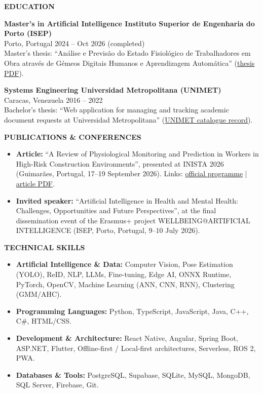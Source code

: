\documentclass[10pt,a4paper]{article}
\newcommand{\cvsection}[1]{%
    \vspace{11pt}%
    {\large\bfseries\color{navy}#1}\par
    \vspace{2pt}{\color{accent}\rule{\linewidth}{1.2pt}}\par
    \vspace{5pt}%
}
\begin{document}
\cvsection{EDUCATION}
\textbf{Master's in Artificial Intelligence \textbar{} Instituto Superior de Engenharia do Porto (ISEP)}\\
{\color{muted}Porto, Portugal \textbar{} 2024 -- Oct 2026 (completed)}\\
Master's thesis: ``Análise e Previsão do Estado Fisiológico de Trabalhadores em Obra através de Gémeos Digitais Humanos e Aprendizagem Automática'' (\href{https://drive.google.com/file/d/1xlqiDRtNX2Xj5_9TnHy6inUlAnseSHbF/view?usp=drive\_link}{thesis PDF}).

\vspace{5pt}
\textbf{Systems Engineering \textbar{} Universidad Metropolitana (UNIMET)}\\
{\color{muted}Caracas, Venezuela \textbar{} 2016 -- 2022}\\
Bachelor's thesis: ``Web application for managing and tracking academic document requests at Universidad Metropolitana'' (\href{https://unimet.ent.sirsi.net/client/es_ES/default/search/detailnonmodal/ent:\%24002f\%24002fSD\_ILS\%24002f0\%24002fSD\_ILS:132264/one}{UNIMET catalogue record}).

\cvsection{PUBLICATIONS \& CONFERENCES}
\begin{itemize}
    \item \textbf{Article:} ``A Review of Physiological Monitoring and Prediction in Workers in High-Risk Construction Environments'', presented at INISTA 2026 (Guimarães, Portugal, 17--19 September 2026). Links: \href{https://inista2026.di.uminho.pt/pdf/INISTA\_Official\_Program.pdf}{official programme} | \href{https://drive.google.com/file/d/1Kh2M0t4dUh3F5vFrKY5sZMfaRxV1H2PT/view?usp=sharing}{article PDF}.
    \item \textbf{Invited speaker:} ``Artificial Intelligence in Health and Mental Health: Challenges, Opportunities and Future Perspectives'', at the final dissemination event of the Erasmus+ project WELLBEING@ARTIFICIAL INTELLIGENCE (ISEP, Porto, Portugal, 9--10 July 2026).
\end{itemize}

\cvsection{TECHNICAL SKILLS}
\begin{itemize}
    \item \textbf{Artificial Intelligence \& Data:} Computer Vision, Pose Estimation (YOLO), ReID, NLP, LLMs, Fine-tuning, Edge AI, ONNX Runtime, PyTorch, OpenCV, Machine Learning (ANN, CNN, RNN), Clustering (GMM/AHC).
    \item \textbf{Programming Languages:} Python, TypeScript, JavaScript, Java, C++, C\#, HTML/CSS.
    \item \textbf{Development \& Architecture:} React Native, Angular, Spring Boot, ASP.NET, Flutter, Offline-first / Local-first architectures, Serverless, ROS 2, PWA.
    \item \textbf{Databases \& Tools:} PostgreSQL, Supabase, SQLite, MySQL, MongoDB, SQL Server, Firebase, Git.
\end{itemize}
\end{document}
